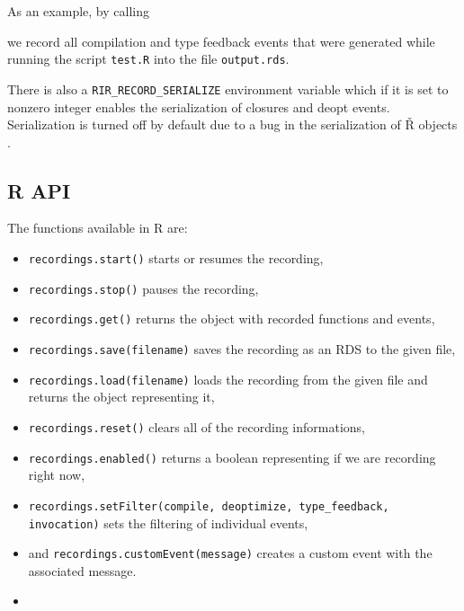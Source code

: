 As an example, by calling


\noindent we record all compilation and type feedback events that were generated while running the script \texttt{test.R} into the file \texttt{output.rds}.

There is also a \texttt{RIR\_RECORD\_SERIALIZE} environment variable which if it is set to nonzero integer enables the serialization of closures and deopt events. Serialization is turned off by default due to a bug in the serialization of Ř objects .

\subsection*{R API}

The functions available in R are: 

\begin{itemize}
	\item \texttt{recordings.start()} starts or resumes the recording,
	\item \texttt{recordings.stop()} pauses the recording,
	\item \texttt{recordings.get()} returns the object with recorded functions and events,

	\item \texttt{recordings.save(filename)} saves the recording as an RDS to the given file,
	\item \texttt{recordings.load(filename)} loads the recording from the given file and returns the object representing it,

	\item \texttt{recordings.reset()} clears all of the recording informations,
	\item \texttt{recordings.enabled()} returns a boolean representing if we are recording right now,

	\item \texttt{recordings.setFilter(compile, deoptimize, type\_feedback, invocation)} sets the filtering of individual events,

	\item and \texttt{recordings.customEvent(message)} creates a custom event with the associated message.
	\item {}
\end{itemize}

